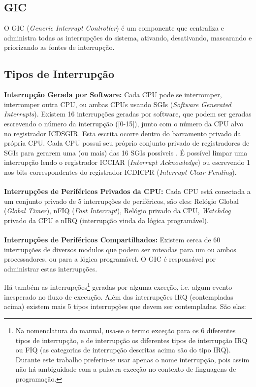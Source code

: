 \subsection{GIC}
O GIC (\emph{Generic Interrupt Controller}) é um componente que centraliza e administra todas as interrupções do sistema, ativando, desativando, mascarando e priorizando as fontes de interrupção.


\subsection{Tipos de Interrupção} %
\label{sec:interrupt}
\textbf{Interrupção Gerada por Software: }
Cada CPU pode se interromper, interromper outra CPU, ou ambas CPUs usando SGIs (\emph{Software Generated Interrupts}). Existem 16 interrupções geradas por software, que podem ser geradas escrevendo o número da interrupção ([0-15]), junto com o número da CPU alvo no registrador ICDSGIR. Esta escrita ocorre dentro do barramento privado da própria CPU. Cada CPU possui seu próprio conjunto privado de registradores de SGIs para gerarem uma (ou mais) das 16 SGIs possíveis \cite[p.~216]{ug585.1.7}. É possível limpar uma interrupção lendo o registrador ICCIAR (\emph{Interrupt Acknowledge}) ou escrevendo 1 nos bits correspondentes do registrador ICDICPR (\emph{Interrupt Clear-Pending}).
\\\\
\textbf{Interrupções de Periféricos Privados da CPU: }
Cada CPU está conectada a um conjunto privado de 5 interrupções de periféricos, são eles: Relógio Global (\emph{Global Timer}), nFIQ (\emph{Fast Interrupt}), Relógio privado da CPU, \emph{Watchdog} privado da CPU e nIRQ (interrupção vinda da lógica programável).
\\\\
\textbf{Interrupções de Periféricos Compartilhados: }
Existem cerca de 60 interrupções de diversos modulos que podem ser roteadas para um ou ambos processadores, ou para a lógica programável. O GIC é responsável por administrar estas interrupções.


Há também as interrupções\footnote{Na nomenclatura do manual, usa-se o termo exceção para os 6 diferentes tipos de interrupção, e de interrupção os diferentes tipos de interrupção IRQ ou FIQ (as categorias de interrupção descritas acima são do tipo IRQ). Durante este trabalho preferiu-se usar apenas o nome interrupção, pois assim não há ambiguidade com a palavra exceção no contexto de linguagens de programação.} geradas por alguma exceção, i.e. algum evento inesperado no fluxo de execução. Além das interrupções IRQ (contempladas acima) existem mais 5 tipos interrupções que devem ser contempladas. São elas:


